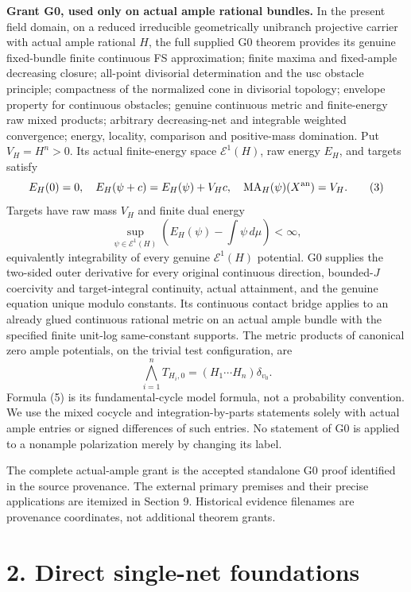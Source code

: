\documentclass[
  10pt,
]{article}
\begin{document}
\textbf{Grant G0, used only on actual ample rational bundles.} In the
present field domain, on a reduced irreducible geometrically unibranch
projective carrier with actual ample rational \(H\), the full supplied
G0 theorem provides its genuine fixed-bundle finite continuous FS
approximation; finite maxima and fixed-ample decreasing closure;
all-point divisorial determination and the usc obstacle principle;
compactness of the normalized cone in divisorial topology; envelope
property for continuous obstacles; genuine continuous metric and
finite-energy raw mixed products; arbitrary decreasing-net and
integrable weighted convergence; energy, locality, comparison and
positive-mass domination. Put \(V_H=H^n>0\). Its actual finite-energy
space \(\mathcal E^1(H)\), raw energy \(E_H\), and targets satisfy
\[ E_H(0)=0,\quad E_H(\psi+c)=E_H(\psi)+V_Hc,
\quad \operatorname{MA}_H(\psi)(X^{\rm an})=V_H.\tag{3}\] Targets have
raw mass \(V_H\) and finite dual energy
\[\sup_{\psi\in\mathcal E^1(H)}\left(E_H(\psi)-\int\psi\,d\mu\right)<\infty,\tag{4}\]
equivalently integrability of every genuine \(\mathcal E^1(H)\)
potential. G0 supplies the two-sided outer derivative for every original
continuous direction, bounded-\(J\) coercivity and target-integral
continuity, actual attainment, and the genuine equation unique modulo
constants. Its continuous contact bridge applies to an already glued
continuous rational metric on an actual ample bundle with the specified
finite unit-log same-constant supports. The metric products of canonical
zero ample potentials, on the trivial test configuration, are
\[\bigwedge_{i=1}^n T_{H_i,0}=(H_1\cdots H_n)\delta_{v_0}.\tag{5}\]
Formula (5) is its fundamental-cycle model formula, not a probability
convention. We use the mixed cocycle and integration-by-parts statements
solely with actual ample entries or signed differences of such entries.
No statement of G0 is applied to a nonample polarization merely by
changing its label.

The complete actual-ample grant is the accepted standalone G0 proof
identified in the source provenance. The external primary premises and
their precise applications are itemized in Section 9. Historical
evidence filenames are provenance coordinates, not additional theorem
grants.

\section{2. Direct single-net
foundations}\label{direct-single-net-foundations}
\end{document}
